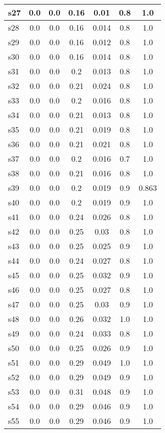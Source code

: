 \documentclass{article}
\begin{document}
\begin{tabular}{|l|c|c|c|c|c|c|}
\hline
s27 &0.0 & 0.0 & 0.16 & 0.01 & 0.8 & 1.0\\
\hline
s28 &0.0 & 0.0 & 0.16 & 0.014 & 0.8 & 1.0\\
\hline
s29 &0.0 & 0.0 & 0.16 & 0.012 & 0.8 & 1.0\\
\hline
s30 &0.0 & 0.0 & 0.16 & 0.014 & 0.8 & 1.0\\
\hline
s31 &0.0 & 0.0 & 0.2 & 0.013 & 0.8 & 1.0\\
\hline
s32 &0.0 & 0.0 & 0.21 & 0.024 & 0.8 & 1.0\\
\hline
s33 &0.0 & 0.0 & 0.2 & 0.016 & 0.8 & 1.0\\
\hline
s34 &0.0 & 0.0 & 0.21 & 0.013 & 0.8 & 1.0\\
\hline
s35 &0.0 & 0.0 & 0.21 & 0.019 & 0.8 & 1.0\\
\hline
s36 &0.0 & 0.0 & 0.21 & 0.021 & 0.8 & 1.0\\
\hline
s37 &0.0 & 0.0 & 0.2 & 0.016 & 0.7 & 1.0\\
\hline
s38 &0.0 & 0.0 & 0.21 & 0.016 & 0.8 & 1.0\\
\hline
s39 &0.0 & 0.0 & 0.2 & 0.019 & 0.9 & 0.863\\
\hline
s40 &0.0 & 0.0 & 0.2 & 0.019 & 0.9 & 1.0\\
\hline
s41 &0.0 & 0.0 & 0.24 & 0.026 & 0.8 & 1.0\\
\hline
s42 &0.0 & 0.0 & 0.25 & 0.03 & 0.8 & 1.0\\
\hline
s43 &0.0 & 0.0 & 0.25 & 0.025 & 0.9 & 1.0\\
\hline
s44 &0.0 & 0.0 & 0.24 & 0.027 & 0.8 & 1.0\\
\hline
s45 &0.0 & 0.0 & 0.25 & 0.032 & 0.9 & 1.0\\
\hline
s46 &0.0 & 0.0 & 0.25 & 0.027 & 0.8 & 1.0\\
\hline
s47 &0.0 & 0.0 & 0.25 & 0.03 & 0.9 & 1.0\\
\hline
s48 &0.0 & 0.0 & 0.26 & 0.032 & 1.0 & 1.0\\
\hline
s49 &0.0 & 0.0 & 0.24 & 0.033 & 0.8 & 1.0\\
\hline
s50 &0.0 & 0.0 & 0.25 & 0.026 & 0.9 & 1.0\\
\hline
s51 &0.0 & 0.0 & 0.29 & 0.049 & 1.0 & 1.0\\
\hline
s52 &0.0 & 0.0 & 0.29 & 0.049 & 0.9 & 1.0\\
\hline
s53 &0.0 & 0.0 & 0.31 & 0.048 & 0.9 & 1.0\\
\hline
s54 &0.0 & 0.0 & 0.29 & 0.046 & 0.9 & 1.0\\
\hline
s55 &0.0 & 0.0 & 0.29 & 0.046 & 0.9 & 1.0\\

\end{tabular}
\end{document}
